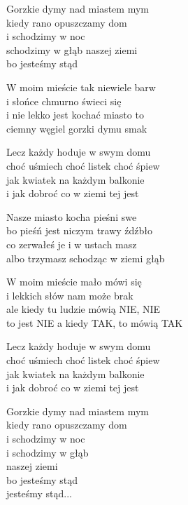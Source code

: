 \begin{text}
 
    Gorzkie dymy nad miastem mym\\
    kiedy rano opuszczamy dom\\
    i schodzimy w noc\\
    schodzimy w głąb naszej ziemi\\
    bo jesteśmy stąd

    W moim mieście tak niewiele barw\\
    i słońce chmurno świeci się\\
    i nie lekko jest kochać miasto to\\
    ciemny węgiel gorzki dymu smak

    \vin Lecz każdy hoduje w swym domu\\
    \vin choć uśmiech choć listek choć śpiew\\
    \vin jak kwiatek na każdym balkonie\\
    \vin i jak dobroć co w ziemi tej jest

    Nasze miasto kocha pieśni swe\\
    bo pieśń jest niczym trawy źdźbło\\
    co zerwałeś je i w ustach masz\\
    albo trzymasz schodząc w ziemi głąb

    W moim mieście mało mówi się\\
    i lekkich słów nam może brak\\
    ale kiedy tu ludzie mówią NIE, NIE\\
    to jest NIE a kiedy TAK, to mówią TAK

    \vin Lecz każdy hoduje w swym domu\\
    \vin choć uśmiech choć listek choć śpiew\\
    \vin jak kwiatek na każdym balkonie\\
    \vin i jak dobroć co w ziemi tej jest

    Gorzkie dymy nad miastem mym\\
    kiedy rano opuszczamy dom\\
    i schodzimy w noc\\
    i schodzimy w głąb\\
    naszej ziemi\\
    bo jesteśmy stąd\\
    jesteśmy stąd...

\end{text}
